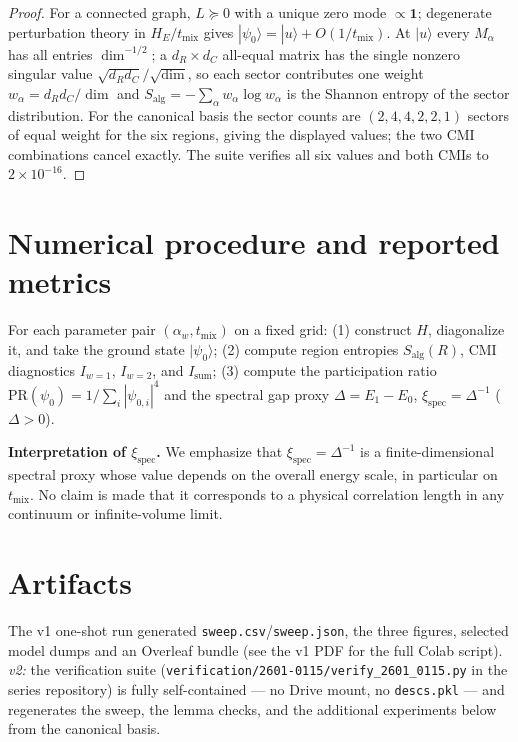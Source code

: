\documentclass[11pt]{article}
\theoremstyle{remark}
\newcommand{\Salg}{S_{\mathrm{alg}}}
\begin{document}
\begin{proof}
For a connected graph, $L \succeq 0$ with a unique zero mode $\propto
\mathbf{1}$; degenerate perturbation theory in $H_E/t_{\mathrm{mix}}$
gives $|\psi_0\rangle = |u\rangle + O(1/t_{\mathrm{mix}})$. At
$|u\rangle$ every $M_\alpha$ has all entries $\dim^{-1/2}$; a $d_R
\times d_C$ all-equal matrix has the single nonzero singular value
$\sqrt{d_R d_C}/\sqrt{\dim}$, so each sector contributes one weight
$w_\alpha = d_R d_C / \dim$ and $\Salg = -\sum_\alpha w_\alpha \log
w_\alpha$ is the Shannon entropy of the sector distribution. For the
canonical basis the sector counts are $(2, 4, 4, 2, 2, 1)$ sectors of
equal weight for the six regions, giving the displayed values; the two
CMI combinations cancel exactly. The suite verifies all six values and
both CMIs to $2\times10^{-16}$.
\end{proof}

\section{Numerical procedure and reported metrics}

For each parameter pair $(\alpha_w, t_{\mathrm{mix}})$ on a fixed grid:
(1) construct $H$, diagonalize it, and take the ground state
$|\psi_0\rangle$; (2) compute region entropies $\Salg(R)$, CMI
diagnostics $I_{w=1}$, $I_{w=2}$, and $I_{\mathrm{sum}}$; (3) compute
the participation ratio $\mathrm{PR}(\psi_0) = 1/\sum_i |\psi_{0,i}|^4$
and the spectral gap proxy $\Delta = E_1 - E_0$, $\xi_{\mathrm{spec}} =
\Delta^{-1}$ ($\Delta > 0$).

\textbf{Interpretation of $\xi_{\mathrm{spec}}$.} We emphasize that
$\xi_{\mathrm{spec}} = \Delta^{-1}$ is a finite-dimensional spectral
proxy whose value depends on the overall energy scale, in particular on
$t_{\mathrm{mix}}$. No claim is made that it corresponds to a physical
correlation length in any continuum or infinite-volume limit.

\section{Artifacts}

The v1 one-shot run generated \texttt{sweep.csv}/\texttt{sweep.json},
the three figures, selected model dumps and an Overleaf bundle (see the
v1 PDF for the full Colab script). \emph{v2:} the verification suite
(\texttt{verification/2601-0115/verify\_2601\_0115.py} in the series
repository) is fully self-contained --- no Drive mount, no
\texttt{descs.pkl} --- and regenerates the sweep, the lemma checks, and
the additional experiments below from the canonical basis.
\end{document}
